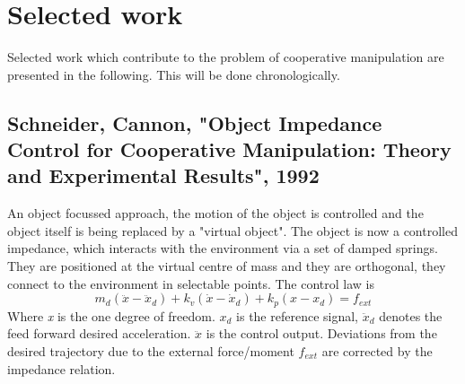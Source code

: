\documentclass[conference]{IEEEtran}
\begin{document}
\section{Selected work}
Selected work which contribute to the problem of cooperative manipulation are presented in the following. This will be done chronologically.


\subsection{Schneider, Cannon, "Object Impedance Control for Cooperative Manipulation: Theory and Experimental Results", 1992}

An object focussed approach, the motion of the object is controlled and the object itself is being replaced by a "virtual object". The object is now a controlled impedance, which interacts with the environment via a set of damped springs. They are positioned at the virtual centre of mass and they are orthogonal, they connect to the environment in selectable points. The control law is
\begin{equation}
m_d(\ddot{x}-\ddot{x}_d) + k_v(\dot{x}-\dot{x}_d) + k_p(x-x_d) = f_{ext}
\end{equation}
Where \textit{x} is the one degree of freedom. \textit{$ x_d $} is the reference signal, $ \ddot{x}_d $ denotes the feed forward desired acceleration. $ \ddot{x} $ is the control output. Deviations from the desired trajectory due to the external force/moment $ f_{ext} $ are corrected by the impedance relation.
\end{document}
